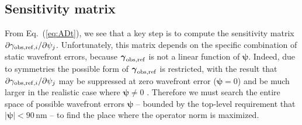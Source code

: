 \subsection{Sensitivity matrix}
\label{ss:drift-sens}

From Eq.~(\ref{eq:ADt}), we see that a key step is to compute the sensitivity matrix $\partial \gamma_{{\rm obs,ref},i}/\partial\psi_j$. Unfortunately, this matrix depends on the specific combination of static wavefront errors, because ${\boldsymbol\gamma}_{\rm obs,ref}$ is not a linear function of ${\boldsymbol\psi}$. Indeed, due to symmetries the possible form of ${\boldsymbol\gamma}_{\rm obs,ref}$ is restricted, with the result that $\partial \gamma_{{\rm obs,ref},i}/\partial\psi_j$ may be suppressed at zero wavefront error (${\boldsymbol\psi}=0$) and be much larger in the realistic case where ${\boldsymbol\psi}\neq 0$ \citep[e.g.][]{2010SPIE.7731E..37N}. Therefore we must search the entire space of possible wavefront errors ${\boldsymbol\psi}$ -- bounded by the top-level requirement that $|{\boldsymbol\psi}|<90\,$nm -- to find the place where the operator norm is maximized.

